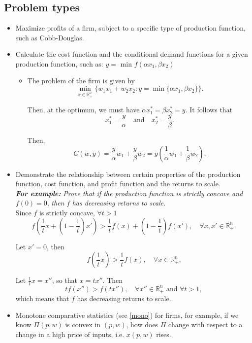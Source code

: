 \documentclass{article}
\begin{document}
\subsection{Problem types}
\begin{itemize}
    \item Maximize profits of a firm, subject to a specific type of production function, such as Cobb-Douglas. 
    \item Calculate the cost function and the conditional demand functions for a given production function, such as: $y =$ min $f(\alpha x_1, \beta x_2)$ 
    \begin{itemize}
    \item The problem of the firm is given by
    \[
    \min_{x \in \mathbb{R}_+^2} \{w_1x_1 + w_2x_2 : y = \min\{\alpha x_1, \beta x_2\}\}.
    \]

    Then, at the optimum, we must have \(\alpha x_1^* = \beta x_2^* = y.\)  
    It follows that
    \[
    x_1^* = \frac{y}{\alpha} \quad \text{and} \quad x_2^* = \frac{y}{\beta}.
    \]

    Then,
    \[
    C(w, y) = \frac{y}{\alpha}w_1 + \frac{y}{\beta}w_2 = y \left(\frac{1}{\alpha}w_1 + \frac{1}{\beta}w_2\right).
    \]
\end{itemize}

    \item Demonstrate the relationship between certain properties of the production function, cost function, and profit function and the returns to scale. \\
    \textbf{\textit{For example:}} \textit{Prove that if the production function is strictly concave and} $f (0) = 0$, \textit{then} $f$ \textit{has decreasing returns to scale}.
\\
Since \(f\) is strictly concave, \(\forall t > 1\)
\[
f\left(\frac{1}{t}x + \left(1 - \frac{1}{t}\right)x'\right) > \frac{1}{t}f(x) + \left(1 - \frac{1}{t}\right)f(x'), \quad \forall x, x' \in \mathbb{R}_+^n.
\]

Let \(x' = 0\), then
\[
f\left(\frac{1}{t}x\right) > \frac{1}{t}f(x), \quad \forall x \in \mathbb{R}_+^n.
\]

Let \(\frac{1}{t}x = x''\), so that \(x = tx''.\) Then
\[
tf(x'') > f(tx''), \quad \forall x'' \in \mathbb{R}_+^n \text{ and } \forall t > 1,
\]
which means that \(f\) has decreasing returns to scale.
    \item Monotone comparative statistics (see \ref{mono}) for firms, for example, if we know $\Pi(p,w)$ is convex in $(p,w)$, how does $\Pi$ change with respect to a change in a high price of inputs, i.e. $x(p,w)$ rises. 
\end{itemize}
\end{document}
